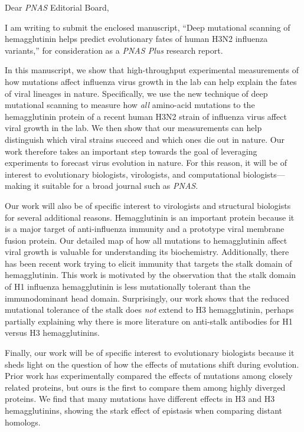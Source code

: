 \documentclass[a4paper,11pt]{letter}
\begin{document}
\begin{letter}{}

\opening{Dear \textit{PNAS} Editorial Board,} %

I am writing to submit the enclosed manuscript, ``Deep mutational scanning of hemagglutinin helps predict evolutionary fates of human H3N2 influenza variants,'' for consideration as a \textit{PNAS Plus} research report.

In this manuscript, we show that high-throughput experimental measurements of how mutations affect influenza virus growth in the lab can help explain the fates of viral lineages in nature.
Specifically, we use the new technique of deep mutational scanning to measure how \emph{all} amino-acid mutations to the hemagglutinin protein of a recent human H3N2 strain of influenza virus affect viral growth in the lab.
We then show that our measurements can help distinguish which viral strains succeed and which ones die out in nature.
Our work therefore takes an important step towards the goal of leveraging experiments to forecast virus evolution in nature.
For this reason, it will be of interest to evolutionary biologists, virologists, and computational biologists---making it suitable for a broad journal such as \textit{PNAS}.

Our work will also be of specific interest to virologists and structural biologists for several additional reasons.
Hemagglutinin is an important protein because it is a major target of anti-influenza immunity and a prototype viral membrane fusion protein.
Our detailed map of how all mutations to hemagglutinin affect viral growth is valuable for understanding its biochemistry.
Additionally, there has been recent work trying to elicit immunity that targets the stalk domain of hemagglutinin.
This work is motivated by the observation that the stalk domain of H1 influenza hemagglutinin is less mutationally tolerant than the immunodominant head domain.
Surprisingly, our work shows that the reduced mutational tolerance of the stalk does \emph{not} extend to H3 hemagglutinin, perhaps partially explaining why there is more literature on anti-stalk antibodies for H1 versus H3 hemagglutinins.

Finally, our work will be of specific interest to evolutionary biologists because it sheds light on the question of how the effects of mutations shift during evolution.
Prior work has experimentally compared the effects of mutations among closely related proteins, but ours is the first to compare them among highly diverged proteins.
We find that many mutations have different effects in H3 and H3 hemagglutinins, showing the stark effect of epistasis when comparing distant homologs.


\end{letter}
\end{document}
